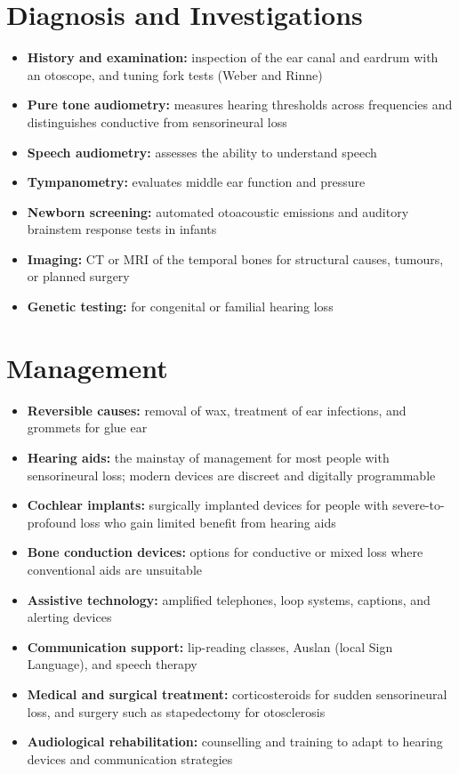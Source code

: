 \section*{Diagnosis and Investigations}
\begin{itemize}
    \item \textbf{History and examination:} inspection of the ear canal and eardrum with an otoscope, and tuning fork tests (Weber and Rinne)
    \item \textbf{Pure tone audiometry:} measures hearing thresholds across frequencies and distinguishes conductive from sensorineural loss
    \item \textbf{Speech audiometry:} assesses the ability to understand speech
    \item \textbf{Tympanometry:} evaluates middle ear function and pressure
    \item \textbf{Newborn screening:} automated otoacoustic emissions and auditory brainstem response tests in infants
    \item \textbf{Imaging:} CT or MRI of the temporal bones for structural causes, tumours, or planned surgery
    \item \textbf{Genetic testing:} for congenital or familial hearing loss
\end{itemize}

\section*{Management}
\begin{itemize}
    \item \textbf{Reversible causes:} removal of wax, treatment of ear infections, and grommets for glue ear
    \item \textbf{Hearing aids:} the mainstay of management for most people with sensorineural loss; modern devices are discreet and digitally programmable
    \item \textbf{Cochlear implants:} surgically implanted devices for people with severe-to-profound loss who gain limited benefit from hearing aids
    \item \textbf{Bone conduction devices:} options for conductive or mixed loss where conventional aids are unsuitable
    \item \textbf{Assistive technology:} amplified telephones, loop systems, captions, and alerting devices
    \item \textbf{Communication support:} lip-reading classes, Auslan (local Sign Language), and speech therapy
    \item \textbf{Medical and surgical treatment:} corticosteroids for sudden sensorineural loss, and surgery such as stapedectomy for otosclerosis
    \item \textbf{Audiological rehabilitation:} counselling and training to adapt to hearing devices and communication strategies
\end{itemize}

